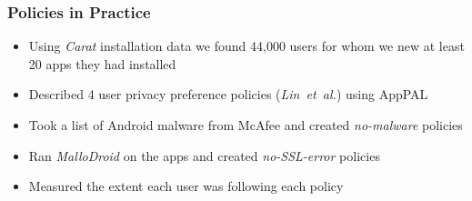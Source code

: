 \documentclass{beamer}
\begin{document}
\begin{frame}
  \frametitle{Policies in Practice}
  \begin{itemize}
  \item Using \emph{Carat} installation data we found 44,000 users for whom we
    new at least 20 apps they had installed
  \item Described 4 user privacy preference policies (\emph{Lin~et~al.}) using
    AppPAL
  \item Took a list of Android malware from McAfee and created \emph{no-malware} policies
  \item Ran \emph{MalloDroid} on the apps and created \emph{no-SSL-error} policies
  \item Measured the extent each user was following each policy 
  \end{itemize}
\end{frame}
\end{document}
